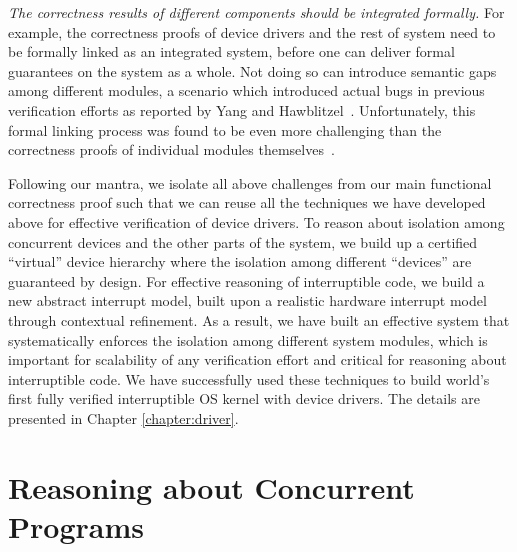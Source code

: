 %
{\em The correctness results of different components should be
integrated formally.} For example, the correctness proofs of device
drivers and the rest of system
need to be formally linked as an integrated system,
before one can deliver formal guarantees on the system as a whole. Not
doing so can introduce semantic gaps among different modules,
a scenario which introduced actual bugs in previous verification
efforts as reported by Yang and Hawblitzel~\cite{hawblitzel10}. Unfortunately,
this formal linking process was found to be even more challenging than
the correctness proofs of individual modules
themselves~\cite{Alkassar:VSTTE08-225}. 

Following our mantra, we isolate all above challenges from our main
functional correctness proof such that we can reuse all the techniques
we have developed above for effective verification of device drivers.
To reason about isolation among concurrent devices and the other parts
of the system, we build up a certified ``virtual'' device hierarchy where
the isolation among different ``devices'' are guaranteed by design.
For effective reasoning of interruptible code, we build a new abstract
interrupt model, built upon a realistic
hardware interrupt model through contextual refinement.
As a result, we have built an effective system that systematically enforces the
isolation among different system modules, which is important
for scalability of any verification effort and critical for reasoning
about interruptible code. 
We have successfully used these techniques to build world's first fully verified
interruptible OS kernel with device drivers.
The details are presented in Chapter \ref{chapter:driver}.

\section{Reasoning about Concurrent Programs}

